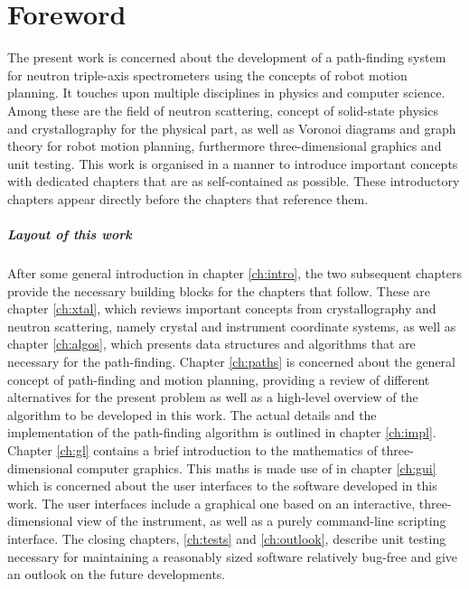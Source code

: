 %
%

\chapter*{Foreword}
The present work is concerned about the development of a path-finding system for neutron triple-axis
spectrometers using the concepts of robot motion planning.
It touches upon multiple disciplines in physics and computer science. Among these are the field
of neutron scattering, concept of solid-state physics and crystallography for the physical part,
as well as Voronoi diagrams and graph theory for robot motion planning, furthermore three-dimensional graphics
and unit testing.
This work is organised in a manner to introduce important concepts with dedicated chapters that are
as self-contained as possible. These introductory chapters appear directly before the chapters that reference
them.

\paragraph{Layout of this work}
After some general introduction in chapter \ref{ch:intro}, the two subsequent chapters 
provide the necessary building blocks for the chapters that follow.
These are chapter \ref{ch:xtal}, which reviews important concepts from crystallography and
neutron scattering, namely crystal and instrument coordinate systems,
as well as chapter \ref{ch:algos}, which presents data structures and algorithms 
that are necessary for the path-finding.
Chapter \ref{ch:paths} is concerned about the general concept of path-finding and motion planning, providing
a review of different alternatives for the present problem as well as a high-level overview of the algorithm
to be developed in this work. The actual details and the implementation of the path-finding algorithm
is outlined in chapter \ref{ch:impl}.
Chapter \ref{ch:gl} contains a brief introduction to the mathematics of three-dimensional computer graphics.
This maths is made use of in chapter \ref{ch:gui} which is concerned about the user interfaces to the software
developed in this work. The user interfaces include a graphical one based on an interactive, three-dimensional
view of the instrument, as well as a purely command-line scripting interface.
The closing chapters, \ref{ch:tests} and \ref{ch:outlook}, describe unit testing necessary for maintaining
a reasonably sized software relatively bug-free and give an outlook on the future developments.

